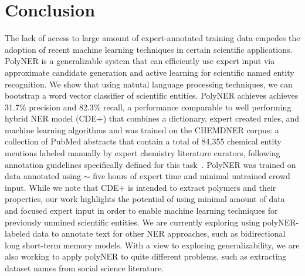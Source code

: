 \section{Conclusion}
\label{sect:conclusion}
The lack of access to large amount of expert-annotated training data empedes the adoption of recent machine learning techniques in certain scientific applications.
PolyNER is a generalizable system that can efficiently use expert input via approximate candidate generation and active learning for scientific named entity recognition.
We show that using natutal language processing techniques, we can bootstrap a word vector classifier of scientific entities.
PolyNER achieves achieves 31.7\% precision and 82.3\% recall, a performance comparable to well performing
hybrid NER model (CDE+) that combines a dictionary, expert created
rules, and machine learning algorithms and was trained on the CHEMDNER corpus:
a collection of  PubMed abstracts that contain a total of 84,355 chemical entity mentions labeled manually by expert chemistry literature curators, following annotation guidelines specifically defined for this task~\cite{krallinger2015chemdner}. 
PolyNER was trained on data annotated using $\sim$ five hours of expert time and minimal untrained crowd input.
While we note that CDE+ is intended to extract polymers and their properties, our work highlights the potential of using minimal amount of data and focused expert input in order to enable machine learning techniques for previously unmined scientific entities. 
We are currently exploring using polyNER-labeled data to annotate text for other NER approaches,
such as bidirectional long short-term memory models.
With a view to exploring generalizability, we are also working to apply polyNER
to quite different problems, such as extracting dataset names from social science
literature. 